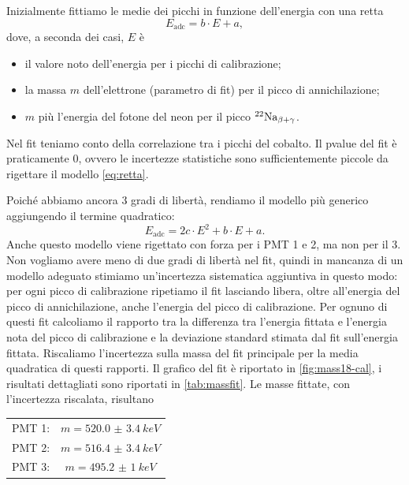 Inizialmente fittiamo le medie dei picchi in funzione dell'energia con una retta
\begin{equation}
	\label{eq:retta}
	E_\text{adc} = b \cdot E + a,
\end{equation}
dove, a seconda dei casi, $E$ è
\begin{itemize}
	\item il valore noto dell'energia per i picchi di calibrazione;
	\item la massa $m$ dell'elettrone (parametro di fit) per il picco di annichilazione;
	\item $m$ più l'energia del fotone del neon per il picco $^{\text{22}}\text{Na}_{\beta+\gamma}$.
\end{itemize}
Nel fit teniamo conto della correlazione tra i picchi del cobalto.
Il pvalue del fit è praticamente 0,
ovvero le incertezze statistiche sono sufficientemente piccole da rigettare il modello \eqref{eq:retta}.

Poiché abbiamo ancora 3 gradi di libertà,
rendiamo il modello più generico aggiungendo il termine quadratico:
\begin{equation}
	\label{eq:parabola}
	E_\text{adc} = 2c \cdot E^2 + b \cdot E + a.
\end{equation}
Anche questo modello viene rigettato con forza per i PMT 1 e 2, ma non per il 3.
Non vogliamo avere meno di due gradi di libertà nel fit,
quindi in mancanza di un modello adeguato stimiamo un'incertezza sistematica aggiuntiva in questo modo:
per ogni picco di calibrazione ripetiamo il fit lasciando libera,
oltre all'energia del picco di annichilazione,
anche l'energia del picco di calibrazione.
Per ognuno di questi fit calcoliamo il rapporto tra
la differenza tra l'energia fittata e l'energia nota del picco di calibrazione
e la deviazione standard stimata dal fit sull'energia fittata.
Riscaliamo l'incertezza sulla massa del fit principale
per la media quadratica di questi rapporti.
Il grafico del fit è riportato in \autoref{fig:mass18-cal},
i risultati dettagliati sono riportati in \autoref{tab:massfit}.
Le masse fittate, con l'incertezza riscalata, risultano
\begin{center}
	\begin{tabular}{cc}
		PMT 1: & $m=\SI{520.0(34)}{keV}$ \\
		PMT 2: & $m=\SI{516.4(34)}{keV}$ \\
		PMT 3: & $m=\SI{495.2(10)}{keV}$
	\end{tabular}
\end{center}
